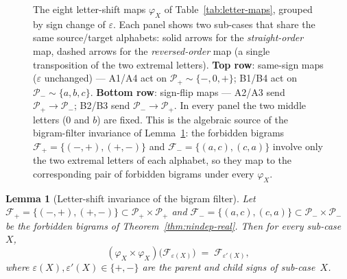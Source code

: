 \documentclass{amsart}
\newtheorem{lemma}[theorem]{Lemma}
\theoremstyle{definition}
\theoremstyle{remark}
\begin{document}
\begin{figure}[ht]
\caption{The eight letter-shift maps $\varphi_X$ of
Table~\ref{tab:letter-maps}, grouped by sign change of
$\varepsilon$.  Each panel shows two sub-cases that share the
same source/target alphabets: solid arrows for the
\emph{straight-order} map, dashed arrows for the
\emph{reversed-order} map (a single transposition of the two
extremal letters).
\textbf{Top row}: same-sign maps ($\varepsilon$ unchanged) ---
A1/A4 act on $\mathcal{P}_+ \sim \{-,0,+\}$;
B1/B4 act on $\mathcal{P}_- \sim \{a,b,c\}$.
\textbf{Bottom row}: sign-flip maps ---
A2/A3 send $\mathcal{P}_+ \to \mathcal{P}_-$;
B2/B3 send $\mathcal{P}_- \to \mathcal{P}_+$.
In every panel the two middle letters ($0$ and $b$) are fixed.
This is the algebraic source of the bigram-filter invariance
of Lemma~\ref{lem:letter-maps}: the forbidden bigrams
$\mathcal{F}_+ = \{(-,+),(+,-)\}$ and
$\mathcal{F}_- = \{(a,c),(c,a)\}$ involve only the two extremal
letters of each alphabet, so they map to the corresponding pair
of forbidden bigrams under every $\varphi_X$.}
\label{fig:letter-maps}
\end{figure}

\begin{lemma}[Letter-shift invariance of the bigram filter]
\label{lem:letter-maps}
Let $\mathcal{F}_+ = \{(-, +), (+, -)\} \subset
\mathcal{P}_+ \times \mathcal{P}_+$ and
$\mathcal{F}_- = \{(a, c), (c, a)\} \subset
\mathcal{P}_- \times \mathcal{P}_-$ be the forbidden bigrams of
Theorem~\ref{thm:nindep-real}.  Then for every sub-case $X$,
\[
  (\varphi_X \times \varphi_X)\bigl(\mathcal{F}_{\varepsilon(X)}\bigr)
  \;=\; \mathcal{F}_{\varepsilon'(X)},
\]
where $\varepsilon(X), \varepsilon'(X) \in \{+, -\}$ are the parent
and child signs of sub-case~$X$.
\end{lemma}
\end{document}

